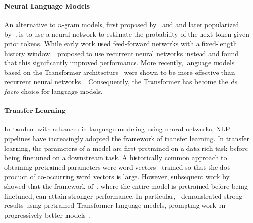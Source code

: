 \documentclass[twoside,11pt]{article}
\begin{document}
\paragraph{Neural Language Models}
An alternative to $n$-gram models, first proposed by~\citet{miikkulainen1991natural} and \citet{schmidhuber1996sequential} and later popularized by~\citet{bengio2000neural}, is to use a neural network to estimate the probability of the next token given prior tokens.
While early work used feed-forward networks with a fixed-length history window,~\citet{mikolov2010recurrent,sutskever2011generating,graves2013generating} proposed to use recurrent neural networks instead and found that this significantly improved performance.
More recently, language models based on the Transformer architecture~\citep{vaswani2017attention} were shown to be more effective than recurrent neural networks~\citep{radford2018improving,al2019character,kaplan2020scaling}.
Consequently, the Transformer has become the \textit{de facto} choice for language models.

\paragraph{Transfer Learning}
In tandem with advances in language modeling using neural networks, NLP pipelines have increasingly adopted the framework of transfer learning.
In transfer learning, the parameters of a model are first pretrained on a data-rich task before being finetuned on a downstream task.
A historically common approach to obtaining pretrained parameters were word vectors~\citep{mikolov2013distributed} trained so that the dot product of co-occurring word vectors is large.
However, subsequent work by~\citet{peters2018deep,howard2018universal,radford2018improving,devlin2019bert} showed that the framework of~\citet{collobert2011natural}, where the entire model is pretrained before being finetuned, can attain stronger performance.
In particular,~\citet{radford2018improving,devlin2019bert} demonstrated strong results using pretrained Transformer language models, prompting work on progressively better models~\citep[etc.]{liu2019roberta,yang2019xlnet,lewis2020bart,raffel2020exploring,zhang2019ernie}.
\end{document}
